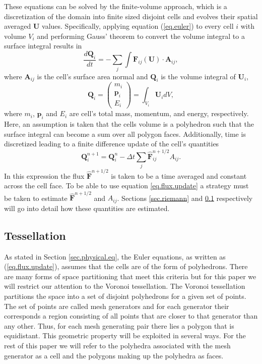 These equations can be solved by the finite-volume approach, which is a
discretization of the domain into finite sized disjoint cells and evolves their
spatial averaged $\mathbf{U}$ values. Specifically, applying equation
(\ref{eq.euler}) to every cell $i$ with volume $V_i$ and performing Gauss'
theorem to convert the volume integral to a surface integral results in
%
\begin{equation}
    \label{eq.euler.int}
    \frac{d\mathbf{Q}_i}{dt} =
    -\sum_{j}\int\mathbf{F}_{ij}(\mathbf{U})\cdot\mathbf{A}_{ij},
\end{equation}
%
where $\mathbf{A}_{ij}$ is the cell's surface area normal and $\mathbf{Q}_i$
is the volume integral of $\mathbf{U}_i$,
%
\begin{equation}
	\mathbf{Q}_i =
    \left(
    \begin{array}{c}
    	m_i \\
        \mathbf{p}_i \\
        E_i
     \end{array}
     \right) = \int_{V_i}\mathbf{U}_i dV,
\end{equation}
where $m_i$, $\mathbf{p}_i$ and $E_i$ are cell's total mass, momentum, and
energy, respectively. Here, an assumption is taken that the cells volume
is a polyhedron such that the surface integral can become a sum over all
polygon faces. Additionally, time is discretized leading to a finite difference
update of the cell's quantities
%
\begin{equation}
    \label{eq.flux.update}
    \mathbf{Q}_i^{n+1} = \mathbf{Q}_i^n - \Delta t\sum_j
    \mathbf{\hat{F}}_{ij}^{n+1/2} A_{ij}.
\end{equation}
%
In this expression the flux $\mathbf{\hat{F}}^{n+1/2}$ is taken to be a time
averaged and constant across the cell face. To be able to use equation
\ref{eq.flux.update} a strategy must be taken to estimate
$\mathbf{\hat{F}}^{n+1/2}$ and $A_{ij}$. Sections \ref{sec.riemann} and
\ref{sec.tessellation} respectively will go into detail how these quantities are
estimated.

\subsection{Tessellation}
\label{sec.tessellation}
As stated in Section \ref{sec.physical.eq}, the Euler equations, as written as
(\ref{eq.flux.update}), assumes that the cells are of the form of polyhedrons.
There are many forms of space partitioning that meet this criteria but for this
paper we will restrict our attention to the Voronoi tessellation. The Voronoi
tessellation partitions the space into a set of disjoint polyhedrons for a
given set of points. The set of points are called mesh generators and for each
generator their corresponds a region consisting of all points that are closer
to that generator than any other. Thus, for each mesh generating pair there
lies a polygon that is equidistant. This geometric property will be exploited
in several ways. For the rest of this paper we will refer to the polyhedra
associated with the mesh generator as a cell and the polygons making up the
polyhedra as faces.

